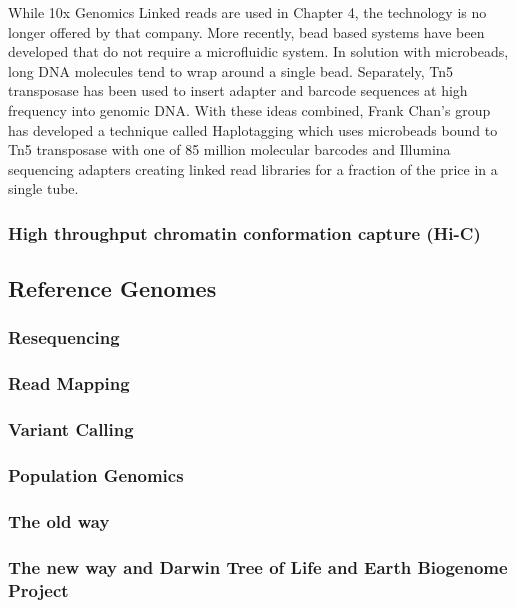 \par{
While 10x Genomics Linked reads are used in Chapter 4, the technology is no longer offered by that company. More recently, bead based systems have been developed that do not require a microfluidic system. In solution with microbeads, long DNA molecules tend to wrap around a single bead\cite{beadphasing}\cite{LFR}. Separately, Tn5 transposase has been used to insert adapter and barcode sequences at high frequency into genomic DNA\cite{cptseq}. With these ideas combined, Frank Chan's group has developed a technique called Haplotagging which uses microbeads bound to Tn5 transposase with one of 85 million molecular barcodes and Illumina sequencing adapters creating linked read libraries for a fraction of the price in a single tube\cite{haplotagging}.
}

\subsubsection{High throughput chromatin conformation capture (Hi-C)}



\subsection{Reference Genomes}
\subsubsection{Resequencing}
\subsubsection{Read Mapping}
\subsubsection{Variant Calling}
\subsubsection{Population Genomics}

\subsubsection{The old way}
\subsubsection{The new way and Darwin Tree of Life and Earth Biogenome Project}


